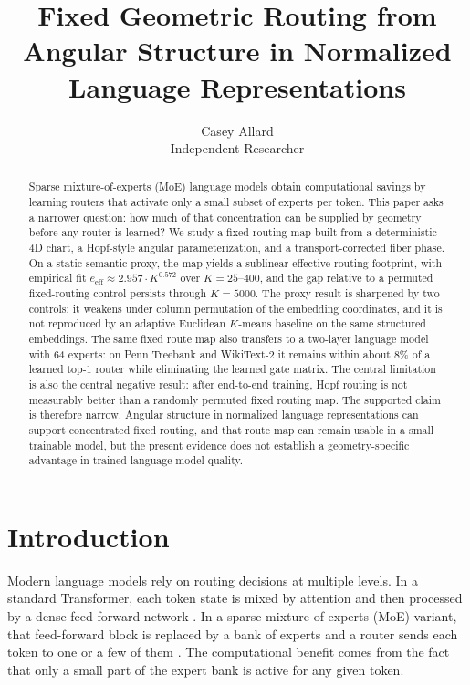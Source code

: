 \documentclass[10pt,letterpaper]{article}
\title{\textbf{Fixed Geometric Routing from Angular Structure in Normalized Language Representations}}
\author{Casey Allard\\Independent Researcher}
\date{}
\begin{document}
\maketitle

\begin{abstract}
Sparse mixture-of-experts (MoE) language models obtain computational savings by learning routers that activate only a small subset of experts per token. This paper asks a narrower question: how much of that concentration can be supplied by geometry before any router is learned? We study a fixed routing map built from a deterministic 4D chart, a Hopf-style angular parameterization, and a transport-corrected fiber phase. On a static semantic proxy, the map yields a sublinear effective routing footprint, with empirical fit $e_{\mathrm{eff}} \approx 2.957 \cdot K^{0.572}$ over $K=25$--$400$, and the gap relative to a permuted fixed-routing control persists through $K=5000$. The proxy result is sharpened by two controls: it weakens under column permutation of the embedding coordinates, and it is not reproduced by an adaptive Euclidean $K$-means baseline on the same structured embeddings. The same fixed route map also transfers to a two-layer language model with 64 experts: on Penn Treebank and WikiText-2 it remains within about $8\%$ of a learned top-1 router while eliminating the learned gate matrix. The central limitation is also the central negative result: after end-to-end training, Hopf routing is not measurably better than a randomly permuted fixed routing map. The supported claim is therefore narrow. Angular structure in normalized language representations can support concentrated fixed routing, and that route map can remain usable in a small trainable model, but the present evidence does not establish a geometry-specific advantage in trained language-model quality.
\end{abstract}

\section{Introduction}
Modern language models rely on routing decisions at multiple levels. In a standard Transformer, each token state is mixed by attention and then processed by a dense feed-forward network \citep{vaswani2017attention}. In a sparse mixture-of-experts (MoE) variant, that feed-forward block is replaced by a bank of experts and a router sends each token to one or a few of them \citep{shazeer2017outrageously, lepikhin2021gshard, fedus2022switch, lewis2021base}. The computational benefit comes from the fact that only a small part of the expert bank is active for any given token.
\end{document}
